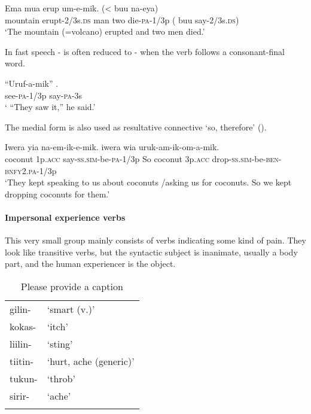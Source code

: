 \ea%
\label{ex:3:x332}
\gll Ema  mua erup um-e-mik. ({{\textless}} buu na-eya) \\
mountain erupt-2/3s.\textsc{ds} man two die-\textsc{pa}-1/3p ( buu say-2/3s.\textsc{ds})\\
\glt`The mountain (=volcano) erupted and two men died.'
\z

In fast speech - is often reduced to - when the verb follows a consonant-final word.

\ea%
\label{ex:3:x333}
\gll ``Uruf-a-mik'' . \\
see-\textsc{pa}-1/3p say-\textsc{pa}-3s \\
\glt` ``They saw it,'' he said.'
\z

The medial form  is also used as resultative connective `so, therefore' ().

\ea%
\label{ex:3:x500}
\gll Iwera yia na-em-ik-e-mik.  iwera wia uruk-am-ik-om-a-mik. \\
coconut 1p.\textsc{acc} say-\textsc{ss}.\textsc{sim}-be-\textsc{pa}-1/3p So coconut 3p.\textsc{acc} drop-\textsc{ss}.\textsc{sim}-be-\textsc{ben}-\textsc{bnfy}2.\textsc{pa}-1/3p\\
\glt`They kept speaking to us about coconuts /asking us for coconuts. So we kept dropping coconuts for them.'
\z

\paragraph{Impersonal experience verbs}\label{sec:3:a:z:y:x}
{}
This very small group mainly consists of verbs indicating some kind of pain. They look like transitive verbs, but the syntactic subject is inanimate, usually a body part, and the human experiencer is the object. 

\begin{table}
\caption{Please provide a caption}
\label{} 
\begin{tabular}{ll}
\mytoprule
gilin- &`smart (v.)'\\
kokas- &`itch'\\
liilin- &`sting'\\
tiitin- &`hurt, ache (generic)'\\
tukun- &`throb'\\
sirir- &`ache'\\
\mybottomrule
\end{tabular}

\end{table}

